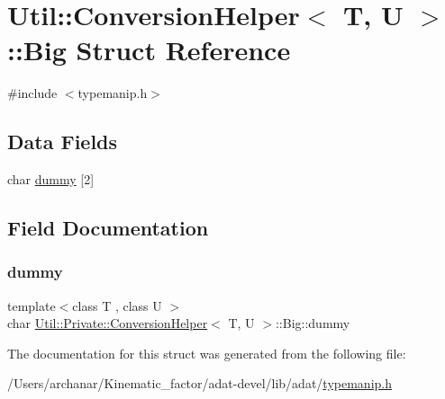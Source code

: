 \hypertarget{structUtil_1_1Private_1_1ConversionHelper_1_1Big}{}\section{Util\+:\+:Conversion\+Helper$<$ T, U $>$\+:\+:Big Struct Reference}
\label{structUtil_1_1Private_1_1ConversionHelper_1_1Big}


{\ttfamily \#include $<$typemanip.\+h$>$}

\subsection*{Data Fields}
\begin{DoxyCompactItemize}
\item 
char \mbox{\hyperlink{structUtil_1_1Private_1_1ConversionHelper_1_1Big_a4c34beb9a09656f84a7c21d4ff219a59}{dummy}} \mbox{[}2\mbox{]}
\end{DoxyCompactItemize}


\subsection{Field Documentation}
\mbox{\label{structUtil_1_1Private_1_1ConversionHelper_1_1Big_a4c34beb9a09656f84a7c21d4ff219a59}} 
\subsubsection{\texorpdfstring{dummy}{dummy}}
{\footnotesize\ttfamily template$<$class T , class U $>$ \\
char \mbox{\hyperlink{structUtil_1_1Private_1_1ConversionHelper}{Util\+::\+Private\+::\+Conversion\+Helper}}$<$ T, U $>$\+::Big\+::dummy}



The documentation for this struct was generated from the following file\+:\begin{DoxyCompactItemize}
\item 
/\+Users/archanar/\+Kinematic\+\_\+factor/adat-\/devel/lib/adat/\mbox{\hyperlink{adat-devel_2lib_2adat_2typemanip_8h}{typemanip.\+h}}\end{DoxyCompactItemize}
